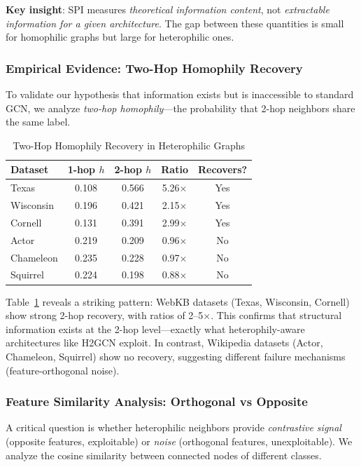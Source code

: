 \textbf{Key insight}: SPI measures \textit{theoretical information content}, not \textit{extractable information for a given architecture}. The gap between these quantities is small for homophilic graphs but large for heterophilic ones.

\subsubsection{Empirical Evidence: Two-Hop Homophily Recovery}

To validate our hypothesis that information exists but is inaccessible to standard GCN, we analyze \textit{two-hop homophily}---the probability that 2-hop neighbors share the same label.

\begin{table}[h]
\centering
\caption{Two-Hop Homophily Recovery in Heterophilic Graphs}
\label{tab:two_hop_recovery}
\small
\begin{tabular}{@{}lcccc@{}}
\toprule
\textbf{Dataset} & \textbf{1-hop $h$} & \textbf{2-hop $h$} & \textbf{Ratio} & \textbf{Recovers?} \\
\midrule
Texas & 0.108 & 0.566 & 5.26$\times$ & Yes \\
Wisconsin & 0.196 & 0.421 & 2.15$\times$ & Yes \\
Cornell & 0.131 & 0.391 & 2.99$\times$ & Yes \\
Actor & 0.219 & 0.209 & 0.96$\times$ & No \\
Chameleon & 0.235 & 0.228 & 0.97$\times$ & No \\
Squirrel & 0.224 & 0.198 & 0.88$\times$ & No \\
\bottomrule
\end{tabular}
\end{table}

Table~\ref{tab:two_hop_recovery} reveals a striking pattern: WebKB datasets (Texas, Wisconsin, Cornell) show strong 2-hop recovery, with ratios of 2--5$\times$. This confirms that structural information exists at the 2-hop level---exactly what heterophily-aware architectures like H2GCN exploit. In contrast, Wikipedia datasets (Actor, Chameleon, Squirrel) show no recovery, suggesting different failure mechanisms (feature-orthogonal noise).

\subsubsection{Feature Similarity Analysis: Orthogonal vs Opposite}

A critical question is whether heterophilic neighbors provide \textit{contrastive signal} (opposite features, exploitable) or \textit{noise} (orthogonal features, unexploitable). We analyze the cosine similarity between connected nodes of different classes.

